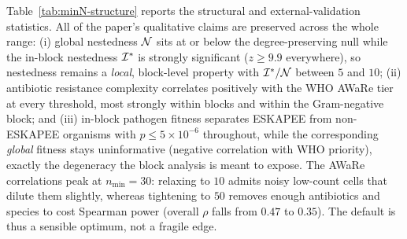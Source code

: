 Table~\ref{tab:minN-structure} reports the structural and external-validation statistics. All of the
paper's qualitative claims are preserved across the whole range: (i) global nestedness $\mathcal{N}$ sits at or
below the degree-preserving null while the in-block nestedness $\mathcal{I}^\ast$ is strongly significant
($z\ge 9.9$ everywhere), so nestedness remains a \emph{local}, block-level property with
$\mathcal{I}^\ast/\mathcal{N}$ between $5$ and $10$; (ii) antibiotic resistance complexity correlates positively with the
WHO AWaRe tier at every threshold, most strongly within blocks and within the Gram-negative block;
and (iii) in-block pathogen fitness separates ESKAPEE from non-ESKAPEE organisms with
$p\le 5\times10^{-6}$ throughout, while the corresponding \emph{global} fitness stays uninformative
(negative correlation with WHO priority), exactly the degeneracy the block analysis is meant to
expose. The AWaRe correlations peak at $n_{\min}=30$: relaxing to $10$ admits noisy low-count cells
that dilute them slightly, whereas tightening to $50$ removes enough antibiotics and species to cost
Spearman power (overall $\rho$ falls from $0.47$ to $0.35$). The default is thus a sensible optimum,
not a fragile edge.

